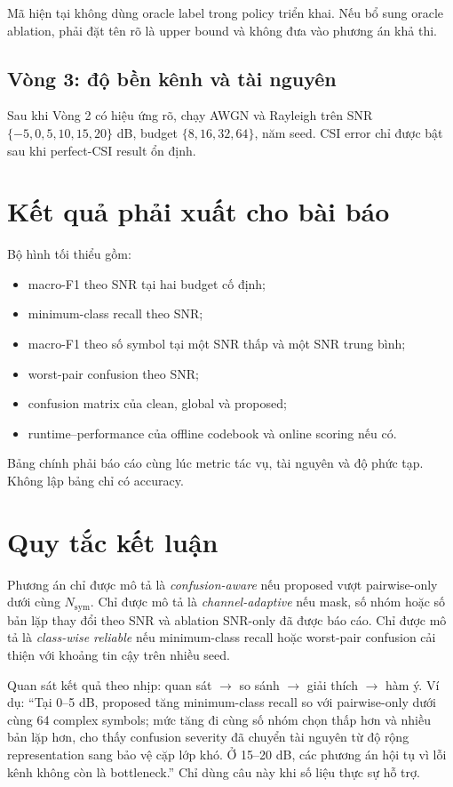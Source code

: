 \documentclass[11pt,journal,onecolumn]{IEEEtran}
\newcommand{\nsym}{N_{\mathrm{sym}}}
\begin{document}
Mã hiện tại không dùng oracle label trong policy triển khai. Nếu bổ sung oracle ablation, phải đặt tên rõ là upper bound và không đưa vào phương án khả thi.

\subsection{Vòng 3: độ bền kênh và tài nguyên}
Sau khi Vòng 2 có hiệu ứng rõ, chạy AWGN và Rayleigh trên SNR $\{-5,0,5,10,15,20\}$ dB, budget $\{8,16,32,64\}$, năm seed. CSI error chỉ được bật sau khi perfect-CSI result ổn định.

\section{Kết quả phải xuất cho bài báo}
Bộ hình tối thiểu gồm:
\begin{itemize}
\item macro-F1 theo SNR tại hai budget cố định;
\item minimum-class recall theo SNR;
\item macro-F1 theo số symbol tại một SNR thấp và một SNR trung bình;
\item worst-pair confusion theo SNR;
\item confusion matrix của clean, global và proposed;
\item runtime--performance của offline codebook và online scoring nếu có.
\end{itemize}

Bảng chính phải báo cáo cùng lúc metric tác vụ, tài nguyên và độ phức tạp. Không lập bảng chỉ có accuracy.

\section{Quy tắc kết luận}
Phương án chỉ được mô tả là \emph{confusion-aware} nếu proposed vượt pairwise-only dưới cùng $\nsym$. Chỉ được mô tả là \emph{channel-adaptive} nếu mask, số nhóm hoặc số bản lặp thay đổi theo SNR và ablation SNR-only đã được báo cáo. Chỉ được mô tả là \emph{class-wise reliable} nếu minimum-class recall hoặc worst-pair confusion cải thiện với khoảng tin cậy trên nhiều seed.

Quan sát kết quả theo nhịp: quan sát $\rightarrow$ so sánh $\rightarrow$ giải thích $\rightarrow$ hàm ý. Ví dụ: ``Tại 0--5 dB, proposed tăng minimum-class recall so với pairwise-only dưới cùng 64 complex symbols; mức tăng đi cùng số nhóm chọn thấp hơn và nhiều bản lặp hơn, cho thấy confusion severity đã chuyển tài nguyên từ độ rộng representation sang bảo vệ cặp lớp khó. Ở 15--20 dB, các phương án hội tụ vì lỗi kênh không còn là bottleneck.'' Chỉ dùng câu này khi số liệu thực sự hỗ trợ.
\end{document}
